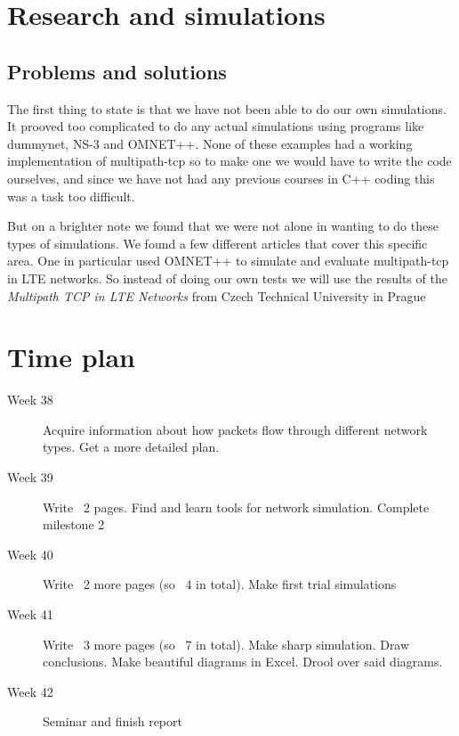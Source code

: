 \documentclass[11pt,twocolumn]{article}
\begin{document}
\section{Research and simulations}

\subsection{Problems and solutions}

The first thing to state is that we have not been able to do our own simulations. It prooved too complicated to do any actual simulations using programs like dummynet, NS-3 and OMNET++. None of these examples had a working implementation of multipath-tcp so to make one we would have to write the code ourselves, and since we have not had any previous courses in C++ coding this was a task too difficult.

But on a brighter note we found that we were not alone in wanting to do these types of simulations. We found a few different articles that cover this specific area. One in particular used OMNET++ to simulate and evaluate multipath-tcp in LTE networks. So instead of doing our own tests we will use the results of the \emph{Multipath TCP in LTE Networks} from Czech Technical University in Prague



\section{Time plan}
\begin{description}
\item[Week 38]
Acquire information about how packets flow through different network types. Get a more detailed plan.
\item[Week 39]
Write ~2 pages. Find and learn tools for network simulation. Complete milestone 2
\item[Week 40]
Write ~2 more pages (so ~4 in total). Make first trial simulations
\item[Week 41]
Write ~3 more pages (so ~7 in total). Make sharp simulation. Draw conclusions. Make beautiful diagrams in Excel. Drool over said diagrams.
\item[Week 42]
Seminar and finish report
\end{description}
\end{document}
